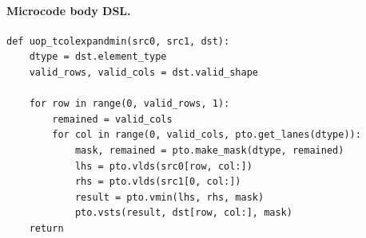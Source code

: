 \paragraph{Microcode body DSL.}
\begin{lstlisting}[style=ptocode]
def uop_tcolexpandmin(src0, src1, dst):
    dtype = dst.element_type
    valid_rows, valid_cols = dst.valid_shape

    for row in range(0, valid_rows, 1):
        remained = valid_cols
        for col in range(0, valid_cols, pto.get_lanes(dtype)):
            mask, remained = pto.make_mask(dtype, remained)
            lhs = pto.vlds(src0[row, col:])
            rhs = pto.vlds(src1[0, col:])
            result = pto.vmin(lhs, rhs, mask)
            pto.vsts(result, dst[row, col:], mask)
    return
\end{lstlisting}
\Needspace{0.34\textheight}
